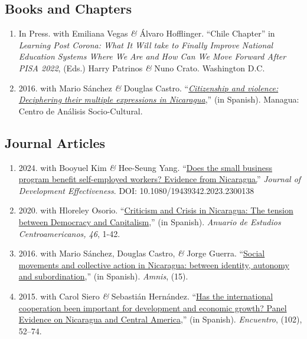 \documentclass[a4paper, 10pt]{article}
\begin{document}
\subsection*{Books and Chapters}

\begin{enumerate}[leftmargin=10pt, label={}, itemindent=-10pt, nosep]
\item In Press. with Emiliana Vegas \textit{\&} Álvaro Hofflinger. ``Chile
Chapter'' in \textit{Learning Post Corona: What It Will take to Finally Improve
National Education Systems Where We Are and How Can We Move Forward After PISA
2022}, (Eds.) Harry Patrinos \textit{\&} Nuno Crato. Washington D.C.
\item 2016. with Mario Sánchez \textit{\&} Douglas Castro. ``\emph{\href{http://biblioteca.clacso.edu.ar/Nicaragua/casc-uca/20150313124733/Ciudadania-y-violencia.pdf}{Citizenship and violence: Deciphering their multiple expressions in Nicaragua}},'' (in Spanish). Managua: Centro de Análisis Socio-Cultural.
\end{enumerate}

\subsection*{Journal Articles}

\begin{enumerate}[leftmargin=10pt, label={}, itemindent=-10pt, nosep]
\item 2024. with Booyuel Kim \textit{\&} Hee-Seung Yang. ``\href{https://www.tandfonline.com/doi/full/10.1080/19439342.2023.2300138}{Does the small business
  program benefit self-employed workers? Evidence from Nicaragua.}''
  \textit{Journal of Development Effectiveness}. DOI: 10.1080/19439342.2023.2300138

\item 2020. with Hloreley Osorio. ``\href{https://revistas.ucr.ac.cr/index.php/anuario/article/view/45081/44860}{Criticism and Crisis in Nicaragua: The tension between Democracy and Capitalism},'' (in Spanish). \emph{Anuario de Estudios Centroamericanos, 46}, 1-42.

\item 2016. with Mario Sánchez, Douglas Castro, \textit{\&} Jorge Guerra. ``\href{https://amnis.revues.org/2813}{Social movements and collective action in Nicaragua: between identity, autonomy and subordination},'' (in Spanish). \emph{Amnis}, (15).

\item 2015. with Carol Siero \textit{\&} Sebastián Hernández. ``\href{http://www.uca.edu.ni/2/images/Revista-Encuentro/Revistas/e102/art-5.pdf}{Has the international cooperation been important for development and economic growth? Panel Evidence on Nicaragua and Central America},'' (in Spanish). \emph{Encuentro}, (102), 52--74.
\end{enumerate}
\end{document}
